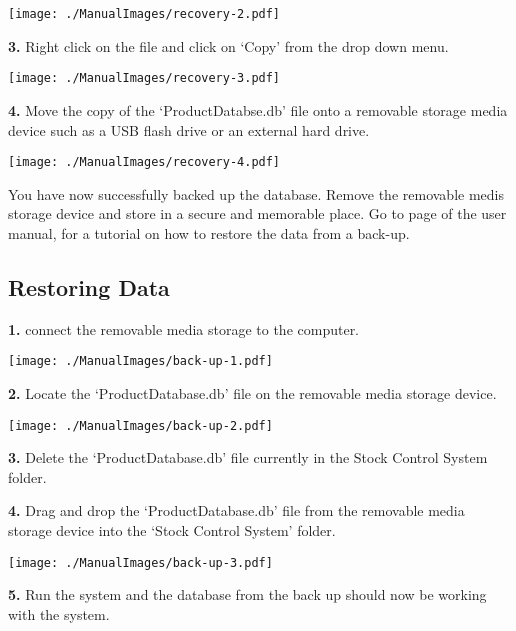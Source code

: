 \texttt{[image: ./ManualImages/recovery-2.pdf]}

\textbf{3.} Right click on the file and click on `Copy' from the drop down menu.

\texttt{[image: ./ManualImages/recovery-3.pdf]}

\textbf{4.} Move the copy of the `ProductDatabse.db' file onto a removable storage media device such as a USB flash drive or an external hard drive.

\texttt{[image: ./ManualImages/recovery-4.pdf]}

You have now successfully backed up the database. Remove the removable medis storage device and store in a secure and memorable place. Go to page \pageref{fig:Restoring Data} of the user manual, for a tutorial on how to restore the data from a back-up.

\pagebreak
\subsection{Restoring Data}
\label{fig:Restoring Data}

\textbf{1.} connect the removable media storage to the computer.

\texttt{[image: ./ManualImages/back-up-1.pdf]}

\textbf{2.} Locate the `ProductDatabase.db' file on the removable media storage device.

\texttt{[image: ./ManualImages/back-up-2.pdf]}

\pagebreak

\textbf{3.} Delete the `ProductDatabase.db' file currently in the Stock Control System folder.

\textbf{4.} Drag and drop the `ProductDatabase.db' file from the removable media storage device into the `Stock Control System' folder.

\texttt{[image: ./ManualImages/back-up-3.pdf]}

\textbf{5.} Run the system and the database from the back up should now be working with the system.

\stopcontents[chapters]